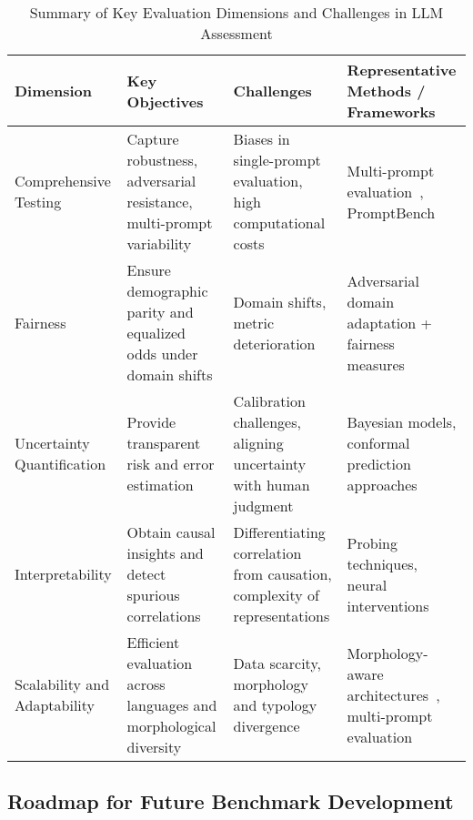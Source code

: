 \documentclass[sigconf]{acmart}
\begin{document}
\begin{table*}[htbp]
\centering
\caption{Summary of Key Evaluation Dimensions and Challenges in LLM Assessment}
\label{tab:evaluation_summary}
\begin{adjustbox}{max width=\textwidth}
\begin{tabular}{@{}llll@{}}
\toprule
\textbf{Dimension}           & \textbf{Key Objectives}                                                & \textbf{Challenges}                                  & \textbf{Representative Methods / Frameworks}           \\ \midrule
Comprehensive Testing        & Capture robustness, adversarial resistance, multi-prompt variability  & Biases in single-prompt evaluation, high computational costs       & Multi-prompt evaluation~\cite{ref25}, PromptBench~\cite{ref11} \\
Fairness                    & Ensure demographic parity and equalized odds under domain shifts       & Domain shifts, metric deterioration                   & Adversarial domain adaptation + fairness measures~\cite{ref41}          \\
Uncertainty Quantification  & Provide transparent risk and error estimation                         & Calibration challenges, aligning uncertainty with human judgment        & Bayesian models, conformal prediction approaches~\cite{ref35}            \\
Interpretability            & Obtain causal insights and detect spurious correlations                & Differentiating correlation from causation, complexity of representations    & Probing techniques, neural interventions~\cite{ref36}                      \\
Scalability and Adaptability & Efficient evaluation across languages and morphological diversity    & Data scarcity, morphology and typology divergence       & Morphology-aware architectures~\cite{ref38}, multi-prompt evaluation  \\
\bottomrule
\end{tabular}
\end{adjustbox}
\end{table*}

\subsection{Roadmap for Future Benchmark Development}
\end{document}
